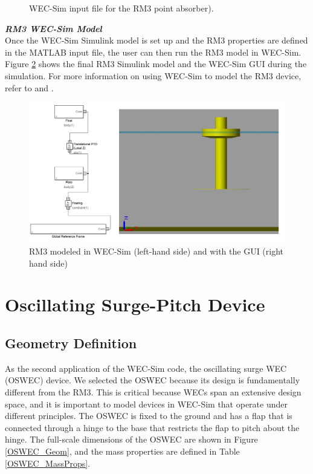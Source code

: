 \begin{figure}[H]
\centering

\caption{WEC-Sim input file for the RM3 point absorber).}
\label{fig:RM3inputFile}
\end{figure}

\textbf{\textit{RM3 WEC-Sim Model}}\\
Once the WEC-Sim Simulink model is set up and the RM3 properties are defined in the MATLAB input file, the user can then run the RM3 model in WEC-Sim.  Figure \ref{RM3_WECSim_GUI} shows the final RM3 Simulink model and the WEC-Sim GUI during the simulation. For more information on using WEC-Sim to model the RM3 device, refer to \cite{kelley_ruehl_preliminary_2014} and \cite{y._yu_development_2014}.

        \begin{figure}[H]
        \centering
        \includegraphics[width=1\textwidth]{application/images/RM3_WECSim_GUI}
        \caption{RM3 modeled in WEC-Sim (left-hand side)  and with the GUI (right hand side)}
        \label{RM3_WECSim_GUI}
        \end{figure}

\section{Oscillating Surge-Pitch Device}
\subsection{Geometry Definition}
As the second application of the WEC-Sim code, the oscillating surge WEC (OSWEC) device. We selected the OSWEC because its design is fundamentally different from the RM3. This is critical because WECs span an extensive design space, and it is important to model devices in WEC-Sim that operate under different principles.  The OSWEC is fixed to the ground and has a flap that is connected through a hinge to the base that restricts the flap to pitch about the hinge. The full-scale dimensions of the OSWEC are shown in Figure \ref{OSWEC_Geom}, and the mass properties are defined in Table \ref{OSWEC_MassProps}.

